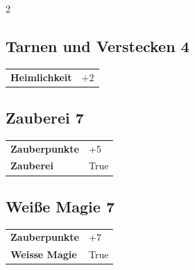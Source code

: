 \begin{multicols}{2}
\begin{tcolorbox}
    \subsection*{Tarnen und Verstecken \hfill \small{4 }}
    \tcblower




\begin{tabular}{@{}ll@{}}
    \textbf{Heimlichkeit} & +2\\
\end{tabular}


\end{tcolorbox}

\begin{tcolorbox}
    \subsection*{Zauberei \hfill \small{7 }}
    \tcblower




\begin{tabular}{@{}ll@{}}
    \textbf{Zauberpunkte} & +5\\
    \textbf{Zauberei} & True\\
\end{tabular}


\end{tcolorbox}

\begin{tcolorbox}
    \subsection*{Weiße Magie \hfill \small{7 }}
    \tcblower




\begin{tabular}{@{}ll@{}}
    \textbf{Zauberpunkte} & +7\\
    \textbf{Weisse Magie} & True\\
\end{tabular}



\end{tcolorbox}
\end{multicols}
